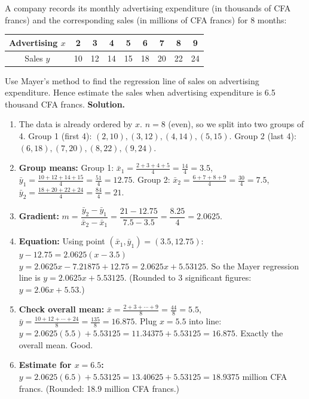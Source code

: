 \documentclass[11pt]{article}
\begin{document}
\begin{exoresolu}
A company records its monthly advertising expenditure (in thousands of CFA francs) and the corresponding sales (in millions of CFA francs) for 8 months:

\begin{center}
\begin{tabular}{|c|c|c|c|c|c|c|c|c|}
\hline
Advertising $x$ & 2 & 3 & 4 & 5 & 6 & 7 & 8 & 9 \\
\hline
Sales $y$       & 10 & 12 & 14 & 15 & 18 & 20 & 22 & 24 \\
\hline
\end{tabular}
\end{center}

Use Mayer's method to find the regression line of sales on advertising expenditure. Hence estimate the sales when advertising expenditure is 6.5 thousand CFA francs.
\tcblower
\textbf{Solution.}

\begin{enumerate}
\item The data is already ordered by $x$. $n=8$ (even), so we split into two groups of 4.
Group 1 (first 4): $(2,10), (3,12), (4,14), (5,15)$.
Group 2 (last 4): $(6,18), (7,20), (8,22), (9,24)$.

\item \textbf{Group means:}
Group 1: $\bar{x}_1 = \frac{2+3+4+5}{4} = \frac{14}{4} = 3.5$,
$\bar{y}_1 = \frac{10+12+14+15}{4} = \frac{51}{4} = 12.75$.
Group 2: $\bar{x}_2 = \frac{6+7+8+9}{4} = \frac{30}{4} = 7.5$,
$\bar{y}_2 = \frac{18+20+22+24}{4} = \frac{84}{4} = 21$.

\item \textbf{Gradient:}
$m = \dfrac{\bar{y}_2 - \bar{y}_1}{\bar{x}_2 - \bar{x}_1} = \dfrac{21 - 12.75}{7.5 - 3.5} = \dfrac{8.25}{4} = 2.0625$.

\item \textbf{Equation:} Using point $(\bar{x}_1, \bar{y}_1) = (3.5, 12.75)$:
$y - 12.75 = 2.0625(x - 3.5)$
$y = 2.0625x - 7.21875 + 12.75 = 2.0625x + 5.53125$.
So the Mayer regression line is $y = 2.0625x + 5.53125$.
(Rounded to 3 significant figures: $y = 2.06x + 5.53$.)

\item \textbf{Check overall mean:}
$\bar{x} = \frac{2+3+\cdots+9}{8} = \frac{44}{8} = 5.5$,
$\bar{y} = \frac{10+12+\cdots+24}{8} = \frac{135}{8} = 16.875$.
Plug $x=5.5$ into line: $y = 2.0625(5.5) + 5.53125 = 11.34375 + 5.53125 = 16.875$. Exactly the overall mean. Good.

\item \textbf{Estimate for $x=6.5$:}
$y = 2.0625(6.5) + 5.53125 = 13.40625 + 5.53125 = 18.9375$ million CFA francs.
(Rounded: 18.9 million CFA francs.)
\end{enumerate}
\end{exoresolu}
\end{document}
